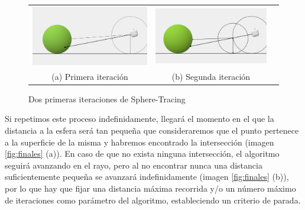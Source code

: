 \begin{figure}[ht]
    \centering
    \begin{tabular}{ccc}
      \includegraphics[scale=0.175]{img/C9/sphere-tracing-1.png} &     \includegraphics[scale=0.215]{img/C9/sphere-tracing-2.png} \\
    (a) Primera iteración & (b) Segunda iteración \\[6pt]
    \end{tabular}
    \caption{Dos primeras iteraciones de Sphere-Tracing}
    \label{fig:iteraciones-ST}
\end{figure}

Si repetimos este proceso indefinidamente, llegará el momento en el que la distancia a la esfera será tan pequeña que consideraremos que el punto pertenece a la superficie de la misma y habremos encontrado la intersección (imagen \ref{fig:finales} (a)). En caso de que no exista ninguna intersección, el algoritmo seguirá avanzando en el rayo, pero al no encontrar nunca una distancia suficientemente pequeña se avanzará indefinidamente (imagen \ref{fig:finales} (b)), por lo que hay que fijar una distancia máxima recorrida y/o un número máximo de iteraciones como parámetro del algoritmo, estableciendo un criterio de parada.

